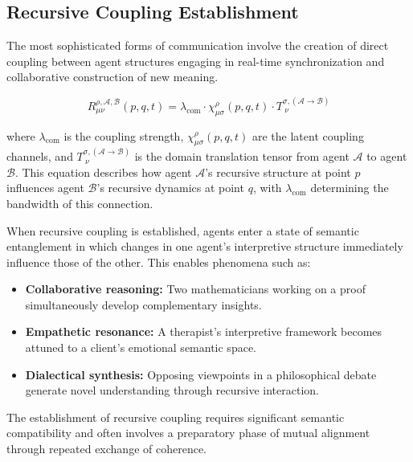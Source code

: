 
\subsection{Recursive Coupling Establishment}
\label{14.3.3:recursive_coupling_establishment}

The most sophisticated forms of communication involve the creation of direct coupling between agent structures engaging in real-time synchronization and collaborative construction of new meaning.

\begin{equation}
R_{\mu\nu}^{\rho, \mathcal{A},\mathcal{B}}(p, q, t) = \lambda_{\mathrm{com}} \cdot \chi^\rho_{\mu\sigma}(p, q, t) \cdot T_{\ \nu}^{\sigma, (\mathcal{A} \to \mathcal{B})}
\end{equation}

where \(\lambda_{\mathrm{com}}\) is the coupling strength, \(\chi^\rho_{\mu\sigma}(p, q, t)\) are the latent coupling channels, and \(T_{\ \nu}^{\sigma, (\mathcal{A} \to \mathcal{B})}\) is the domain translation tensor from agent \(\mathcal{A}\) to agent \(\mathcal{B}\). This equation describes how agent \(\mathcal{A}\)'s recursive structure at point \(p\) influences agent \(\mathcal{B}\)'s recursive dynamics at point \(q\), with \(\lambda_{\mathrm{com}}\) determining the bandwidth of this connection.

When recursive coupling is established, agents enter a state of semantic entanglement in which changes in one agent's interpretive structure immediately influence those of the other. This enables phenomena such as:

\begin{itemize}
    \item \textbf{Collaborative reasoning:} Two mathematicians working on a proof simultaneously develop complementary insights.
    \item \textbf{Empathetic resonance:} A therapist's interpretive framework becomes attuned to a client's emotional semantic space.
    \item \textbf{Dialectical synthesis:} Opposing viewpoints in a philosophical debate generate novel understanding through recursive interaction.
\end{itemize}

The establishment of recursive coupling requires significant semantic compatibility and often involves a preparatory phase of mutual alignment through repeated exchange of coherence.

